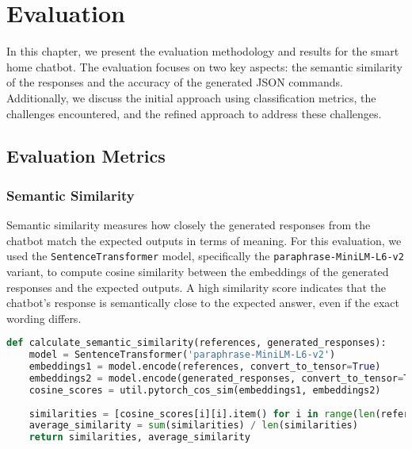 
\chapter{Evaluation}
\label{chap:evaluation}

In this chapter, we present the evaluation methodology and results for the smart home chatbot. The evaluation focuses on two key aspects: the semantic similarity of the responses and the accuracy of the generated JSON commands. Additionally, we discuss the initial approach using classification metrics, the challenges encountered, and the refined approach to address these challenges.

\section{Evaluation Metrics}

\subsection{Semantic Similarity}

Semantic similarity measures how closely the generated responses from the chatbot match the expected outputs in terms of meaning. For this evaluation, we used the \texttt{SentenceTransformer} model, specifically the \texttt{paraphrase-MiniLM-L6-v2} variant, to compute cosine similarity between the embeddings of the generated responses and the expected outputs. A high similarity score indicates that the chatbot's response is semantically close to the expected answer, even if the exact wording differs.

\begin{lstlisting}[language=Python, caption=Code for calculating the semantic similarity through cosine similarity]
def calculate_semantic_similarity(references, generated_responses):
    model = SentenceTransformer('paraphrase-MiniLM-L6-v2')
    embeddings1 = model.encode(references, convert_to_tensor=True)
    embeddings2 = model.encode(generated_responses, convert_to_tensor=True)
    cosine_scores = util.pytorch_cos_sim(embeddings1, embeddings2)
    
    similarities = [cosine_scores[i][i].item() for i in range(len(references))]
    average_similarity = sum(similarities) / len(similarities)
    return similarities, average_similarity
\end{lstlisting}


